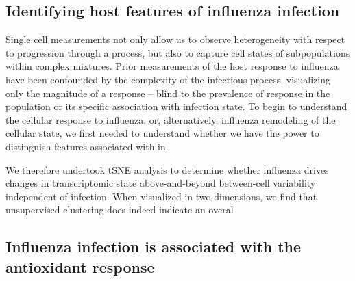 \documentclass[9pt,lineno]{elife}
\begin{document}
\subsection{Identifying host features of influenza infection}
Single cell measurements not only allow us to observe heterogeneity with respect to progression through a process, but also to capture cell states of subpopulations within complex mixtures.
Prior measurements of the host response to influenza have been confounded by the complexity of the infectious process, visualizing only the magnitude of a response -- blind to the prevalence of response in the population or its specific association with infection state.
To begin to understand the cellular response to influenza, or, alternatively, influenza remodeling of the cellular state, we first needed to understand whether we have the power to distinguish features associated with in.

We therefore undertook tSNE analysis to determine whether influenza drives changes in transcriptomic state above-and-beyond between-cell variability independent of infection. 
When visualized in two-dimensions, we find that unsupervised clustering does indeed indicate an overal

\subsection{Influenza infection is associated with the antioxidant response}
\end{document}
